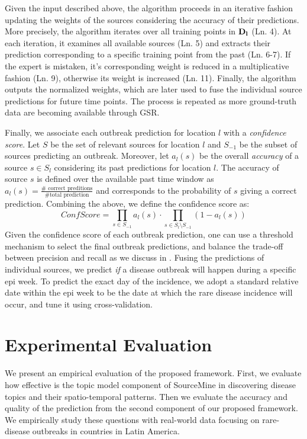 \documentclass[conference]{IEEEtran}
\newcommand{\fullmodel}{{{\sf SourceMine}}\xspace}
\begin{document}
Given the input described above, the algorithm proceeds in an iterative fashion updating the weights of the sources considering the accuracy of their predictions. More precisely, the algorithm iterates over all training points in ${\bf D_l}$ (Ln. 4).  At each iteration, it examines all available sources (Ln. 5) and extracts their prediction corresponding to a specific training point from the past (Ln. 6-7). If the expert is mistaken, it's corresponding weight is reduced in a multiplicative fashion (Ln. 9), otherwise its weight is increased (Ln. 11). Finally, the algorithm outputs the normalized weights, which are later used to fuse the individual source predictions for future time points. The process is repeated as more ground-truth data are becoming available through GSR.

Finally, we associate each outbreak prediction for location $l$ with a {\em confidence score}. Let $S$ be the set of relevant sources for location $l$ and $S_{-1}$ be the subset of sources predicting an outbreak. Moreover, let $a_l(s)$ be the overall {\em accuracy} of a source $s \in S_l$ considering its past predictions for location $l$. The accuracy of source $s$ is defined over the available past time window as $a_l(s) = \frac{\#\mbox{ correct preditions}}{\#\mbox{total prediction}}$ and corresponds to the probability of $s$ giving a correct prediction. Combining the above, we define the confidence score as: 
\begin{equation}
ConfScore = \prod_{s \in S_{-1}}a_l(s) \cdot \prod_{s \in S_l \setminus S_{-1}} (1 - a_l(s))
\label{eq:conf}
\end{equation}
Given the confidence score of each outbreak prediction, one can use a threshold mechanism to select the final outbreak predictions, and balance the trade-off between precision and recall as we discuss in . Fusing the predictions of individual sources, we predict  {\em if} a disease outbreak will happen during a specific epi week. To predict the exact day of the incidence, we adopt a standard relative date within the epi week to be the date at which the rare disease incidence will occur, and tune it using cross-validation. 


\section{Experimental Evaluation}
\label{sec:exp}
We present an empirical evaluation of the proposed framework. First, we evaluate how effective is the topic model component of \fullmodel in discovering disease topics and their spatio-temporal patterns. Then we evaluate the accuracy and quality of the prediction from the second component of our proposed framework. We empirically study these questions with real-world data focusing on rare-disease outbreaks in countries in Latin America.
\end{document}
